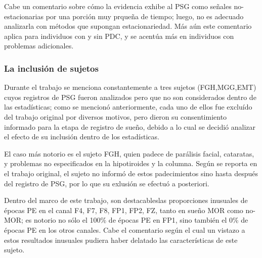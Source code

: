 Cabe un comentario sobre c\'omo la evidencia exhibe al PSG como se\~nales no-estacionarias
por una porci\'on muy prque\~na de tiempo; luego, no es adecuado analizarla con m\'etodos que
supongan estacionariedad. M\'as a\'un este comentario aplica para individuos con y sin PDC, y
se acent\'ua m\'as en individuos con problemas adicionales.

\subsubsection{La inclusi\'on de sujetos}


Durante el trabajo se menciona constantemente a tres sujetos (FGH,MGG,EMT) cuyos
registros de PSG fueron analizados
pero que no son considerados dentro de las estad\'isticas; 
como se mencion\'o anteriormente,
cada uno de ellos fue exclu\'ido del
trabajo original \cite{VazquezTagle16} 
por diversos motivos, pero dieron su consentimiento informado para la etapa
de registro de sue\~no, 
debido a lo cual se decidi\'o analizar el efecto de su inclusi\'on dentro 
de los estad\'isticas.

El caso m\'as notorio es el sujeto FGH, quien padece de par\'alisis facial,
cataratas, y problemas 
no especificados en la 
hipotiroides y la columna. Seg\'un se reporta en el trabajo original,
el sujeto no inform\'o de estos padecimientos sino hasta despu\'es del registro de PSG, por lo
que su exlusi\'on se efectu\'o a posteriori.

Dentro del marco de este trabajo, son destacableslas proporciones inusuales de \'epocas PE
en el canal F4, F7, F8, FP1, FP2, FZ, tanto en sue\~no MOR como no-MOR; es notorio no s\'olo
el 100\% de \'epocas PE en FP1, sino tambi\'en el 0\% de \'epocas PE en los otros canales. 
Cabe el comentario seg\'un el cual un vistazo a estos resultados inusuales pudiera haber
delatado las caracter\'isticas de este sujeto.


